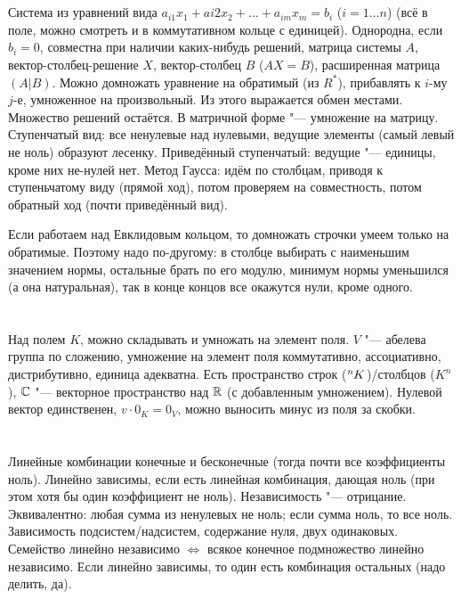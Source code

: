 \section{} %
Система из уравнений вида $a_{i1}x_1+a{i2}x_2+\dots+a_{im}x_m = b_i$ ($i = 1 \dots n$) (всё в поле, можно смотреть и в коммутативном кольце с единицей).
Однородна, если $b_i=0$, совместна при наличии каких-нибудь решений, матрица системы $A$, вектор-столбец-решение $X$, вектор-столбец $B$ ($AX=B$), расширенная матрица $(A|B)$.
Можно домножать уравнение на обратимый (из $R^*$), прибавлять к $i$-му $j$-е, умноженное на произвольный.
Из этого выражается обмен местами.
Множество решений остаётся.
В матричной форме "--- умножение на матрицу.
Ступенчатый вид: все ненулевые над нулевыми, ведущие элементы (самый левый не ноль) образуют лесенку.
Приведённый ступенчатый: ведущие "--- единицы, кроме них не-нулей нет.
Метод Гаусса: идём по столбцам, приводя к ступеньчатому виду (прямой ход), потом проверяем на совместность, потом обратный ход (почти приведённый вид).

Если работаем над Евклидовым кольцом, то домножать строчки умеем только на обратимые.
Поэтому надо по-другому: в столбце выбирать с наименьшим значением нормы, остальные брать по его модулю, минимум нормы уменьшился (а она натуральная),
так в конце концов все окажутся нули, кроме одного.

\section{} %
Над полем $K$, можно складывать и умножать на элемент поля.
$V$ "--- абелева группа по сложению, умножение на элемент поля коммутативно, ассоциативно, дистрибутивно, единица адекватна.
Есть пространство строк ($\tensor[^n]{K}{}$)/столбцов ($K^n$), $\mathbb{C}$ "--- векторное пространство над $\mathbb{R}$ (с добавленным умножением).
Нулевой вектор единственен, $v \cdot 0_K = 0_V$, можно выносить минус из поля за скобки.

\section{} %
Линейные комбинации конечные и бесконечные (тогда почти все коэффициенты ноль).
Линейно зависимы, если есть линейная комбинация, дающая ноль (при этом хотя бы один коэффициент не ноль).
Независимость "--- отрицание.
Эквивалентно: любая сумма из ненулевых не ноль; если сумма ноль, то все ноль.
Зависимость подсистем/надсистем, содержание нуля, двух одинаковых.
Семейство линейно независимо $\iff$ всякое конечное подмножество линейно независимо.
Если линейно зависимы, то один есть комбинация остальных (надо делить, да).

